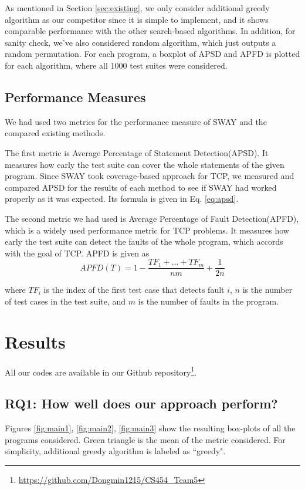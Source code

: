 \documentclass[10pt,journal,compsoc]{IEEEtran}
\begin{document}
	As mentioned in Section \ref{sec:existing}, we only consider additional greedy algorithm as our competitor since it is simple to implement, and it shows comparable performance with the other search-based algorithms.
	In addition, for sanity check, we've also considered random algorithm, which just outputs a random permutation.
	For each program, a boxplot of APSD and APFD is plotted for each algorithm, where all $1000$ test suites were considered.
	
	\subsection{Performance Measures}
	We had used two metrics for the performance measure of SWAY and the compared existing methods. 
	
	The first metric is Average Percentage of Statement Detection(APSD). It measures how early the test suite can cover the whole statements of the given program. Since SWAY took coverage-based approach for TCP, we measured and compared APSD for the results of each method to see if SWAY had worked properly as it was expected. Its formula is given in Eq. \ref{eq:apsd}.
	
	The second metric we had used is Average Percentage of Fault Detection(APFD), which is a widely used performance metric for TCP problems. It measures how early the test suite can detect the faults of the whole program, which accords with the goal of TCP. APFD is given as
	\[ APFD(T) = 1 - \frac{TF_1 + \dots + TF_m}{nm} + \frac{1}{2n} \]
	
	where $TF_i$ is the index of the first test case that detects fault $i$, $n$ is the number of test cases in the test suite, and $m$ is the number of faults in the program. 
	
	
	
	\section{Results}
	All our codes are available in our Github repository\footnote{\url{https://github.com/Dongmin1215/CS454_Team5}}.
	
	\subsection{RQ1: How well does our approach perform?}
	Figures \ref{fig:main1}, \ref{fig:main2}, \ref{fig:main3} show the resulting box-plots of all the programs considered.
	Green triangle is the mean of the metric considered.
	For simplicity, additional greedy algorithm is labeled as ``greedy".
	
\end{document}
